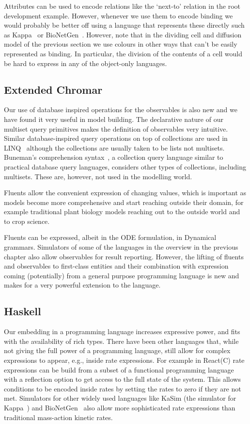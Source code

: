 Attributes can be used to encode relations like the `next-to' relation in the
root development example.  However, whenever we use them to encode binding we
would probably be better off using a language that represents these directly
such as Kappa~\cite{danos2008} or BioNetGen~\cite{blinov2004bionetgen}.
However, note that in the dividing cell and diffusion model of the previous
section we use colours in other ways that can't be easily represented as
binding.  In particular, the division of the contents of a cell would be hard to
express in any of the object-only languages.


\subsection{Extended Chromar}
Our use of database inspired operations for the observables is also new and we
have found it very useful in model building. The declarative nature of our
multiset query primitives makes the definition of observables very
intuitive. Similar database-inspired query operations on top of collections are
used in LINQ~\citep{budiu_compiler_2013} although the collections are usually taken
to be lists not multisets. Buneman's comprehension
syntax~\citep{buneman_comprehension_1994}, a collection query language similar to
practical database query languages, considers other types of collections,
including multisets. These are, however, not used in the modelling world.

Fluents allow the convenient expression of changing values, which is
important as models become more comprehensive and start reaching outside their
domain, for example traditional plant biology models reaching out to the outside
world and to crop science.

Fluents can be expressed, albeit in the ODE formulation, in Dynamical
grammars. Simulators of some of the languages in the overview in the previous
chapter also allow observables for result reporting. However, the lifting of
fluents and observables to first-class entities and their combination with
expression coming (potentially) from a general purpose programming language is
new and makes for a very powerful extension to the language.

\subsection{Haskell}
Our embedding in a programming language increases expressive power, and fits
with the availability of rich types.  There have been other languages that,
while not giving the full power of a programming language, still allow for
complex expressions to appear, e.g., inside rate expressions. For example in
React(C) \citep{john_biochemical_2011} rate expressions can be build from a subset
of a functional programming language with a reflection option to get access to
the full state of the system. This allows conditions to be encoded inside rates
by setting the rates to zero if they are not met. Simulators for other widely
used languages like KaSim (the simulator for Kappa~\citep{danos2008}) and
BioNetGen~\citep{blinov_bionetgen:_2004} also allow more sophisticated rate
expressions than traditional mass-action kinetic rates.

